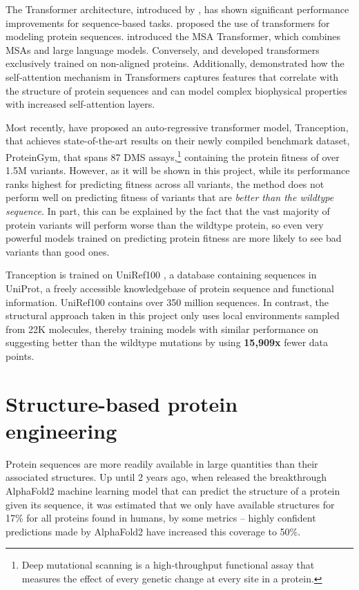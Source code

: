 The Transformer architecture, introduced by \citet{vaswani2017attention}, has shown significant performance improvements for sequence-based tasks. \citet{madani2020progen, nambiar2020transforming, rives2021biological} proposed the use of transformers for modeling protein sequences. \citet{Rao2020} introduced the MSA Transformer, which combines MSAs and large language models. Conversely, \citet{elnaggar2021prottrans} and \citet{meier2021language} developed transformers exclusively trained on non-aligned proteins. Additionally, \citet{vig2020bertology} demonstrated how the self-attention mechanism in Transformers captures features that correlate with the structure of protein sequences and can model complex biophysical properties with increased self-attention layers.

Most recently, \citet{tranception} have proposed an auto-regressive transformer model, Tranception, that achieves state-of-the-art results on their newly compiled benchmark dataset, ProteinGym, that spans 87 DMS assays,\footnote{Deep mutational scanning is a high-throughput functional assay that measures the effect of every genetic change at every site in a protein.} containing the protein fitness of over 1.5M variants. However, as it will be shown in this project, while its performance ranks highest for predicting fitness across all variants, the method does not perform well on predicting fitness of variants that are \textit{better than the wildtype sequence}. In part, this can be explained by the fact that the vast majority of protein variants will perform worse than the wildtype protein, so even very powerful models trained on predicting protein fitness are more likely to see bad variants than good ones. 

Tranception is trained on UniRef100 \cite{uniref}, a database containing sequences in UniProt, a freely accessible knowledgebase of protein sequence and functional information. UniRef100 contains over 350 million sequences. In contrast, the structural approach taken in this project only uses local environments sampled from 22K molecules, thereby training models with similar performance on suggesting better than the wildtype mutations by using \textbf{15,909x} fewer data points. 

\section{Structure-based protein engineering}
Protein sequences are more readily available in large quantities than their associated structures. Up until 2 years ago, when \citet{alphafold} released the breakthrough AlphaFold2 machine learning model that can predict the structure of a protein given its sequence, it was estimated that we only have available structures for 17\% for all proteins found in humans, by some metrics \cite{portapardo2022structural} – highly confident predictions made by AlphaFold2 have increased this coverage to 50\%.   


